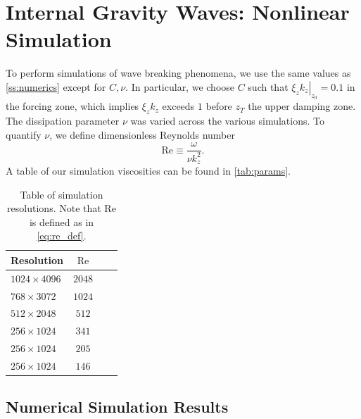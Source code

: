 \documentclass[
        fleqn,
        usenatbib,
    ]{mnras}
\newcommand*{\at}[1]{\left.#1\right|}
\begin{document}
\section{Internal Gravity Waves: Nonlinear Simulation}\label{s:sim}


To perform simulations of wave breaking phenomena, we use the same values as
\autoref{ss:numerics} except for $C, \nu$. In particular, we choose $C$ such
that $\at{\xi_z k_z}_{z_0} = 0.1$ in the forcing zone, which implies $\xi_z k_z
$ exceeds $1$ before $z_T$ the upper damping zone. The dissipation parameter
$\nu$ was varied across the various simulations. To quantify $\nu$, we define
dimensionless Reynolds number
\begin{equation}
    \mathrm{Re}  \equiv \frac{\omega}{\nu k_{z}^2}. \label{eq:re_def}
\end{equation}
A table of our simulation viscosities can be found in \autoref{tab:params}.
\begin{table}
    \centering
    \begin{tabular}{l c c c}
        Resolution & $\mathrm{Re}$\\\bottomrule
        $1024 \times 4096$ & $2048$\\
        $768 \times 3072$ & $1024$\\
        $512 \times 2048$ & $512$\\
        $256 \times 1024$ & $341$\\
        $256 \times 1024$ & $205$\\
        $256 \times 1024$ & $146$\\
    \end{tabular}
    \caption{Table of simulation resolutions. Note that $\mathrm{Re}$ is defined
    as in \autoref{eq:re_def}.}\label{tab:params}
\end{table}

\subsection{Numerical Simulation Results}\label{ss:nl_ns}
\end{document}
